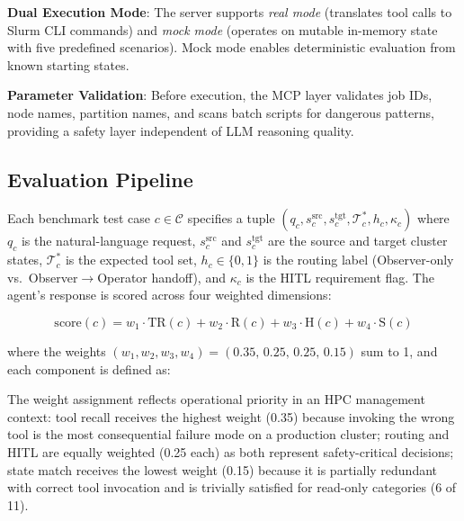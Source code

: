 \textbf{Dual Execution Mode}: The server supports \emph{real mode} (translates tool calls to Slurm CLI commands) and \emph{mock mode} (operates on mutable in-memory state with five predefined scenarios). Mock mode enables deterministic evaluation from known starting states.

\textbf{Parameter Validation}: Before execution, the MCP layer validates job IDs, node names, partition names, and scans batch scripts for dangerous patterns, providing a safety layer independent of LLM reasoning quality.

\subsection{Evaluation Pipeline}

Each benchmark test case $c \in \mathcal{C}$ specifies a tuple $(q_c, s_c^{\text{src}}, s_c^{\text{tgt}}, \mathcal{T}_c^*, h_c, \kappa_c)$ where $q_c$ is the natural-language request, $s_c^{\text{src}}$ and $s_c^{\text{tgt}}$ are the source and target cluster states, $\mathcal{T}_c^*$ is the expected tool set, $h_c \in \{0,1\}$ is the routing label (Observer-only vs.\ Observer$\rightarrow$Operator handoff), and $\kappa_c$ is the HITL requirement flag. The agent's response is scored across four weighted dimensions:

\begin{equation}
    \text{score}(c) = w_1 \cdot \text{TR}(c) + w_2 \cdot \text{R}(c) + w_3 \cdot \text{H}(c) + w_4 \cdot \text{S}(c)
    \label{eq:scoring}
\end{equation}

where the weights $(w_1, w_2, w_3, w_4) = (0.35,\, 0.25,\, 0.25,\, 0.15)$ sum to 1, and each component is defined as:

The weight assignment reflects operational priority in an HPC management context: tool recall receives the highest weight (0.35) because invoking the wrong tool is the most consequential failure mode on a production cluster; routing and HITL are equally weighted (0.25 each) as both represent safety-critical decisions; state match receives the lowest weight (0.15) because it is partially redundant with correct tool invocation and is trivially satisfied for read-only categories (6 of 11).

